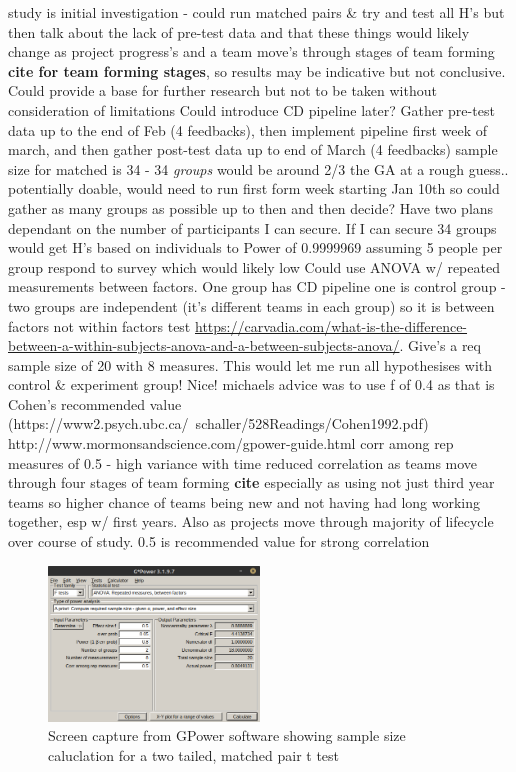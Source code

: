 \documentclass[lettersize,journal]{IEEEtran}
\begin{document}
        study is initial investigation - could run matched pairs \& try and test all H's but then talk about the lack of pre-test data and that these things would likely change as  project progress's and a team move's through stages of team forming \textbf{cite for team forming stages}, so results may be indicative but not conclusive. Could provide a base for further research but not to be taken without consideration of limitations 
        Could introduce CD pipeline later? Gather pre-test data up to the end of Feb (4 feedbacks), then implement pipeline first week of march, and then gather post-test data up to end of March (4 feedbacks)
        sample size for matched is 34 - 34 \textit{groups} would be around 2/3 the GA at a rough guess.. potentially doable, would need to run first form week starting Jan 10th so could gather as many groups as possible up to then and then decide? Have two plans dependant on the number of participants I can secure. If I can secure 34 groups would get H's based on individuals to Power of 0.9999969 assuming 5 people per group respond to survey which would likely low
        Could use ANOVA w/ repeated measurements between factors. One group has CD pipeline one is control group - two groups are independent (it's different teams in each group) so it is between factors not within factors test \url{https://carvadia.com/what-is-the-difference-between-a-within-subjects-anova-and-a-between-subjects-anova/}. Give's a req sample size of 20 with 8 measures. This would let me run all hypothesises with control \& experiment group! Nice! michaels advice was to use f of 0.4 as that is Cohen's recommended value (https://www2.psych.ubc.ca/~schaller/528Readings/Cohen1992.pdf)
        http://www.mormonsandscience.com/gpower-guide.html
        corr among rep measures of 0.5 - high variance with time reduced correlation as teams move through four stages of team forming \textbf{cite} especially as using not just third year teams so higher chance of teams being new and not having had long working together, esp w/ first years. Also as projects move through majority of lifecycle over course of study. 0.5 is recommended value for strong correlation

        \begin{figure}[h!]
            \includegraphics[width=0.5\textwidth]{Images/ANOVA_2.png}
            \caption{Screen capture from GPower software showing sample size caluclation for a two tailed, matched pair t test}
            \label{ANOVArepeatedbetween}
        \end{figure}
\end{document}
